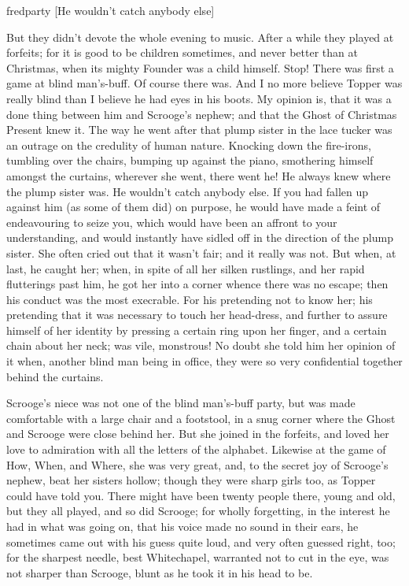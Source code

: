   \begin{colorbigpic}
    [\basicscale] 
    {fredparty}
    [He wouldn't catch anybody else]
  \end{colorbigpic}


But they didn't devote the whole evening to music. After a while they played at
forfeits; for it is good to be children sometimes, and never better than at
Christmas, when its mighty Foun\-der was a child himself. Stop! There was first
a game at blind man's-buff. Of course there was. And I no more believe Topper
was really blind than I believe he had eyes in his boots. My opinion is, that it
was a done thing between him and Scrooge's nephew; and that the Ghost of
Christmas Present knew it. The way he went after that plump sister in the lace
tucker was an outrage on the credulity of human nature. Knocking down the
fire-irons, tumbling over the chairs, bumping up against the piano, smothering
himself amongst the curtains, wherever she went, there went he! He always knew
where the plump sister was. He wouldn't catch anybody else. If you had fallen up
against him (as some of them did) on purpose, he would have made a feint of
endeavouring to seize you, which would have been an affront to your
understanding, and would instantly have sidled off in the direction of the plump
sister. She often cried out that it wasn't fair; and it really was not. But
when, at last, he caught her; when, in spite of all her silken rustlings, and
her rapid flutterings past him, he got her into a corner whence there was no
escape; then his conduct was the most execrable. For his pretending not to know
her; his pretending that it was necessary to touch her head-dress, and further
to assure himself of her identity by pressing a certain ring upon her finger,
and a certain chain about her neck; was vile, monstrous! No doubt she told him
her opinion of it when, another blind man being in office, they were so very
confidential together behind the curtains.

Scrooge's niece was not one of the blind man's-buff party, but was made
comfortable with a large chair and a footstool, in a snug corner where the Ghost
and Scrooge were close behind her. But she joined in the forfeits, and loved her
love to admiration with all the letters of the alphabet. Likewise at the game of
How, When, and Where, she was very great, and, to the secret joy of Scrooge's
nephew, beat her sisters hollow; though they were sharp girls too, as Topper
could have told you. There might have been twenty people there, young and old,
but they all played, and so did Scrooge; for wholly forgetting, in the interest
he had in what was going on, that his voice made no sound in their ears, he
sometimes came out with his guess quite loud, and very often guessed right, too;
for the sharpest needle, best White\-chap\-el, warranted not to cut in the eye, was
not sharper than Scrooge, blunt as he took it in his head to be.

